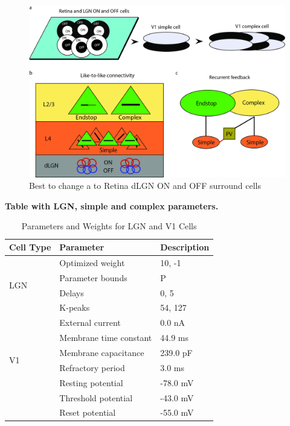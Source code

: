 \documentclass[12pt]{article}
\begin{document}
\begin{figure}[htbp!]
  \centering
  \includegraphics[width=1.0 \textwidth]{figures/overview.jpg}
  \caption{Best to change a to Retina dLGN ON and OFF surround cells}
  \label{fig:LIF connectivity}
\end{figure}

\bigbreak
\textbf{Table with LGN, simple and complex parameters.}

\begin{table}[h!]
\centering
\caption{Parameters and Weights for LGN and V1 Cells}
\begin{tabular}{lll}
\toprule
\textbf{Cell Type} & \textbf{Parameter} & \textbf{Description} \\
\midrule
\multirow{4}{*}{LGN} 
    & Optimized weight      & 10, -1 \\
    & Parameter bounds   & P \\
    & Delays   & 0, 5 \\
    & K-peaks   & 54, 127 \\
\midrule
\multirow{6}{*}{V1} 
    & External current         & 0.0 nA \\
    & Membrane time constant        & 44.9 ms \\
    & Membrane capacitance          & 239.0 pF \\
    & Refractory period       & 3.0 ms \\
    & Resting potential          & -78.0 mV \\
    & Threshold potential         & -43.0 mV \\
    & Reset potential      & -55.0 mV \\
\bottomrule
\end{tabular}
\end{table}
\end{document}

